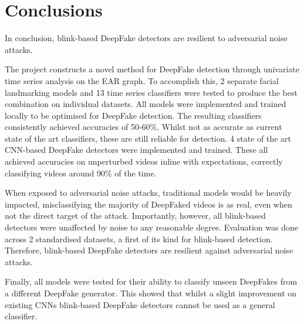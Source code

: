 \chapter{Conclusions}
\label{ch:conclusions}


In conclusion, blink-based DeepFake detectors are resilient to adversarial noise attacks.

The project constructs a novel method for DeepFake detection through univariate time series analysis on the EAR graph. To accomplish this, 2 separate facial landmarking models and 13 time series classifiers were tested to produce the best combination on individual datasets. All models were implemented and trained locally to be optimised for DeepFake detection. The resulting classifiers consistently achieved accuracies of 50-60\%. Whilst not as accurate as current state of the art classifiers, these are still reliable for detection. 4 state of the art CNN-based DeepFake detectors were implemented and trained. These all achieved accuracies on unperturbed videos inline with expectations, correctly classifying videos around 90\% of the time.

When exposed to adversarial noise attacks, traditional models would be heavily impacted, misclassifying the majority of DeepFaked videos is as real, even when not the direct target of the attack. Importantly, however, all blink-based detectors were unaffected by noise to any reasonable degree. Evaluation was done across 2 standardised datasets, a first of its kind for blink-based detection. Therefore, blink-based DeepFake detectors are resilient against adversarial noise attacks.

Finally, all models were tested for their ability to classify unseen DeepFakes from a different DeepFake generator. This showed that whilst a slight improvement on existing CNNs blink-based DeepFake detectors cannot be used as a general classifier.

